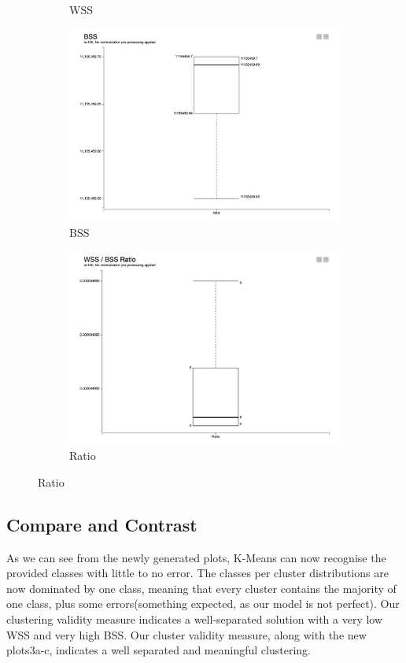 \documentclass[11pt]{article}
\begin{document}
\begin{figure}[H]
\begin{subfigure}{0.3\textwidth}
					\caption{WSS}
					\label{fig:first}
				\end{subfigure}
				\hfill
				\begin{subfigure}{0.3\textwidth}
					\includegraphics[width=\textwidth]{res/t2/t24/t24-BSS-plot}
					\caption{BSS}
					\label{fig:second}
				\end{subfigure}
				\hfill
				\begin{subfigure}{0.3\textwidth}
					\includegraphics[width=\textwidth]{res/t2/t24/t24-Ratio-plot}
					\caption{Ratio}
					\label{fig:third}
				\end{subfigure}
			\end{figure}
			\fi
			
			
		\subsection*{Compare and Contrast}
			As we can see from the newly generated plots, K-Means can now recognise the provided classes with little to no error. The classes per cluster distributions are now dominated by one class, meaning that every cluster contains the majority of one class, plus some errors(something expected, as our model is not perfect). Our clustering validity measure indicates a well-separated solution with a very low WSS and very high BSS. Our cluster validity measure, along with the new plots3a-c, indicates a well separated and meaningful clustering.
		
\end{document}
